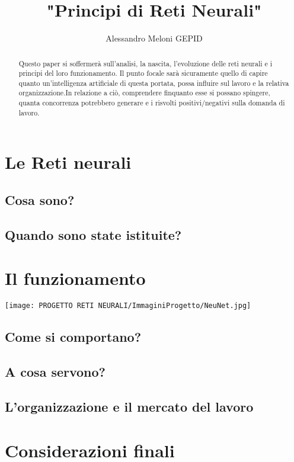 \documentclass{article}
\title{\textbf{"Principi di Reti Neurali"}}
\author{Alessandro Meloni GEPID}
\date{}
\begin{document}
\maketitle
\begin{abstract}
\begin{justify}
    Questo paper si soffermerà sull'analisi, la nascita, l'evoluzione delle reti neurali e i principi del loro funzionamento. Il punto focale sarà sicuramente quello di capire quanto un'intelligenza artificiale di questa portata, possa influire sul lavoro e la relativa organizzazione.In relazione a ciò, comprendere finquanto esse si possano spingere, quanta concorrenza potrebbero generare e i risvolti positivi/negativi sulla domanda di lavoro.
\end{justify}
\end{abstract}
\centering \tableofcontents
\centering \newpage
\section{Le Reti neurali}
\flushleft \subsection{Cosa sono?}
\citep{IBM2021}
\flushleft\subsection{Quando sono state istituite?}

\centering \newpage
\section{Il funzionamento}

 \texttt{[image: PROGETTO RETI NEURALI/ImmaginiProgetto/NeuNet.jpg]}
    \label{F1:foto reti}

\flushleft \subsection{Come si comportano?}

\flushleft \subsection{A cosa servono?}
 
\flushleft \subsection{L'organizzazione e il mercato del lavoro}

\centering \newpage
\section{Considerazioni finali}


\end{document}
